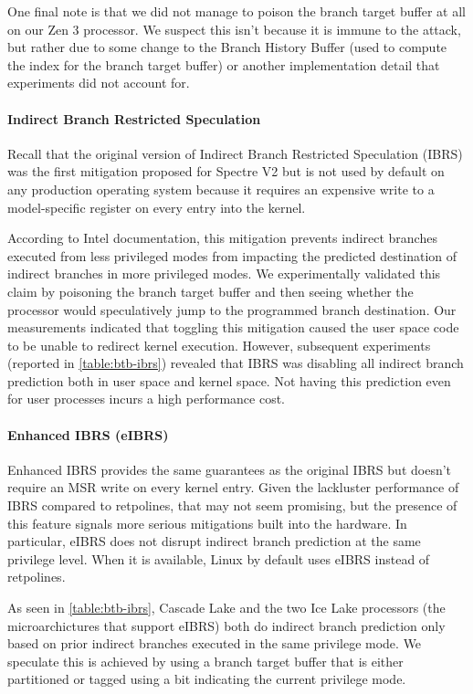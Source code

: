 One final note is that we did not manage to poison the branch target buffer at all on our Zen 3 processor.
We suspect this isn't because it is immune to the attack, but rather due to some change to the Branch History Buffer (used to compute the index for the branch target buffer) or another implementation detail that experiments did not account for.

\paragraph{Indirect Branch Restricted Speculation}

Recall that the original version of Indirect Branch Restricted Speculation (IBRS) was the first mitigation proposed for Spectre V2 but is not used by default on any production operating system because it requires an expensive write to a model-specific register on every entry into the kernel.

According to Intel documentation, this mitigation prevents indirect branches executed from less privileged modes from impacting the predicted destination of indirect branches in more privileged modes.
We experimentally validated this claim by poisoning the branch target buffer and then seeing whether the processor would speculatively jump to the programmed branch destination.
Our measurements indicated that toggling this mitigation caused the
user space code to be unable to redirect kernel execution.
However, subsequent experiments (reported in
\autoref{table:btb-ibrs}) revealed that IBRS was disabling all
indirect branch prediction both in user space and kernel space.
Not having this prediction even for user processes incurs a high performance cost.

\paragraph{Enhanced IBRS (eIBRS)}

Enhanced IBRS provides the same guarantees as the original IBRS but doesn't require an MSR write on every kernel entry.
Given the lackluster performance of IBRS compared to retpolines, that may not seem promising, but the presence of this feature signals more serious mitigations built into the hardware.
In particular, eIBRS does not disrupt indirect branch prediction at the same privilege level.
When it is available, Linux by default uses eIBRS instead of retpolines.

As seen in \autoref{table:btb-ibrs}, Cascade Lake and the two Ice Lake
processors (the microarchictures that support eIBRS) both do indirect branch prediction only based on prior indirect branches executed in the same privilege mode.
We speculate this is achieved by using a branch target buffer that is either partitioned or tagged using a bit indicating the current privilege mode.

